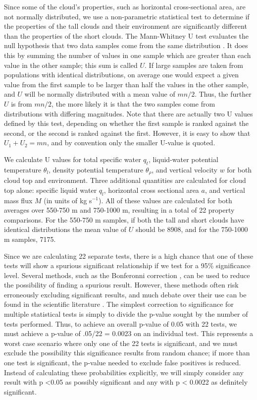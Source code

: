 \documentclass[acp]{copernicus}
\begin{document}
Since some of the cloud's properties, such as horizontal cross-sectional area, 
are not normally distributed, we use a non-parametric statistical test to 
determine if the properties of the tall clouds and their environment are 
significantly different than the properties of the short clouds.  The 
Mann-Whitney U test evaluates the null hypothesis that two data samples come 
from the same distribution \citep{Mann1947}.  It does this by summing the 
number of values in one sample which are greater than each value in the other 
sample; this sum is called $U$.  If large samples are taken from populations 
with identical distributions, on average one would expect a given value from 
the first sample to be larger than half the values in the other sample, and $U$ 
will be normally distributed with a mean value of $mn/2$.  Thus, the further 
$U$ is from $mn/2$, the more likely it is that the two samples come from 
distributions with differing magnitudes.  Note that there are actually two U 
values defined by this test, depending on whether the first sample is ranked 
against the second, or the second is ranked against the first.  However, it is 
easy to show that $U_1 + U_2 = mn$, and by convention only the smaller U-value 
is quoted.

We calculate U values for total specific water $q_t$, liquid-water potential 
temperature $\theta_l$, density potential temperature $\theta_\rho$, and 
vertical velocity $w$ for both cloud top and environment.  Three additional 
quantities are calculated for cloud top alone: specific liquid water $q_l$, 
horizontal cross sectional area $a$, and vertical mass flux $M$ (in units of 
kg s$^{-1}$).  All of these values are calculated for both averages over 
550-750 m and 750-1000 m, resulting in a total of 22 property comparisons.  
For the 550-750 m samples, if both the tall and short clouds have identical 
distributions the mean value of $U$ should be 8908, and for the 750-1000 m 
samples, 7175.  

Since we are calculating 22 separate tests, there is a high chance that one of 
these tests will show a spurious significant relationship if we test for a 95\% 
significance level.  Several methods, such as the Bonferonni correction 
\citep{Shaffer1995}, can be used to reduce the possibility of finding a 
spurious result.  However, these methods often risk erroneously excluding 
significant results, and much debate over their use can be found in the 
scientific literature \citep{Perneger1998, Nakagawa2004}.  The simplest 
correction to significance for multiple statistical tests is simply to divide 
the p-value sought by the number of tests performed.  Thus, to achieve an 
overall p-value of 0.05 with 22 tests, we must achieve a p-value of .05/22 = 
0.0023 on an individual test. This represents a worst case scenario where only 
one of the 22 tests is significant, and we must exclude the possibility this 
significance results from random chance; if more than one test is significant, 
the p-value needed to exclude false positives is reduced.  Instead of 
calculating these probabilities explicitly, we will simply consider any result 
with p \textless 0.05 as possibly significant and any with p \textless 
0.0022 as definitely significant.  
\end{document}
